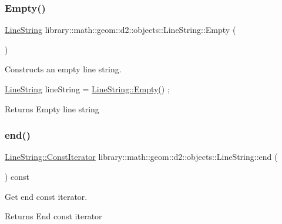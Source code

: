 \subsubsection{\texorpdfstring{Empty()}{Empty()}}
{\footnotesize\ttfamily \hyperlink{classlibrary_1_1math_1_1geom_1_1d2_1_1objects_1_1_line_string}{Line\+String} library\+::math\+::geom\+::d2\+::objects\+::\+Line\+String\+::\+Empty (\begin{DoxyParamCaption}{ }\end{DoxyParamCaption})\hspace{0.3cm}{\ttfamily [static]}}



Constructs an empty line string. 


\begin{DoxyCode}
\hyperlink{classlibrary_1_1math_1_1geom_1_1d2_1_1objects_1_1_line_string_aa313a076051c7fb722b9eeb6d5bf2f7e}{LineString} lineString = \hyperlink{classlibrary_1_1math_1_1geom_1_1d2_1_1objects_1_1_line_string_af8a783642dc4ba67d4e0ca2140cda343}{LineString::Empty}() ;
\end{DoxyCode}


\begin{DoxyReturn}{Returns}
Empty line string 
\end{DoxyReturn}
\mbox{\label{classlibrary_1_1math_1_1geom_1_1d2_1_1objects_1_1_line_string_af86afe62a24b648504822b3adc6c5ecd}} 
\subsubsection{\texorpdfstring{end()}{end()}}
{\footnotesize\ttfamily \hyperlink{classlibrary_1_1math_1_1geom_1_1d2_1_1objects_1_1_line_string_a7c7a81b557da8ed855b5f4b88a5fa837}{Line\+String\+::\+Const\+Iterator} library\+::math\+::geom\+::d2\+::objects\+::\+Line\+String\+::end (\begin{DoxyParamCaption}{ }\end{DoxyParamCaption}) const}



Get end const iterator. 

\begin{DoxyReturn}{Returns}
End const iterator 
\end{DoxyReturn}
\mbox{\label{classlibrary_1_1math_1_1geom_1_1d2_1_1objects_1_1_line_string_a038dba8bffbcaaf498a349341458db4a}} 
